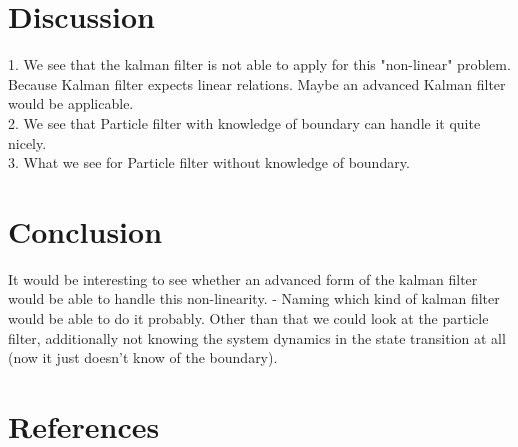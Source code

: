\documentclass[conference]{IEEEtran}
\begin{document}

\section{Discussion}


1. We see that the kalman filter is not able to apply for this "non-linear" problem. Because Kalman filter expects linear relations. Maybe an advanced Kalman filter would be applicable. \\
2. We see that Particle filter with knowledge of boundary can handle it quite nicely.  \\
3.  What we see for Particle filter without knowledge of boundary. \\

\section{Conclusion}

It would be interesting to see whether an advanced form of the kalman filter would be able to handle this non-linearity. 
- Naming which kind of kalman filter would be able to do it probably.
Other than that we could look at the particle filter, additionally not knowing the system dynamics in the state transition at all (now it just doesn't know of the boundary).




\section*{References}
\end{document}

